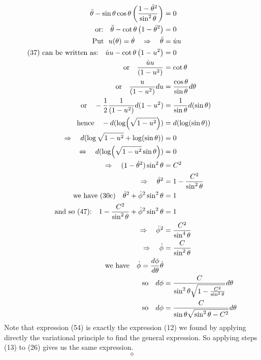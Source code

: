 \begin{align}
\ddot{\theta} - \sin\theta\cos\theta\left(\frac{1 - \dot{\theta}^2}{\sin^2\theta}\right)&= 0\\
\text{or:}\quad \ddot{\theta} - \cot\theta\left( 1-\dot{\theta}^2\right) &= 0\\
\text{Put }\ u(\theta)= \dot{\theta}\quad\Rightarrow\quad \ddot{\theta} &= \dot{u}u\\
\text{(37) can be written as:}\quad \dot{u}u - \cot\theta\left( 1-u^2\right) &= 0\\
\text{or}\quad \frac{\dot{u}u}{\left( 1-u^2\right)} &= \cot\theta\\
\text{or}\quad \frac{u}{\left( 1-u^2\right)}du &= \frac{\cos\theta}{\sin\theta} d\theta\\
\text{or}\quad -\frac{1}{2}\frac{1}{\left( 1-u^2\right)}d(1-u^2) &= \frac{1}{\sin \theta} d(\sin\theta)\\
\text{hence}\quad -d(\log (\sqrt{1-u^2})) &= d(\log(\sin\theta))\\
\Rightarrow \quad d(\log \sqrt{1-u^2} +\log(\sin\theta))&=0\\
\Leftrightarrow \quad d(\log( \sqrt{1-u^2}\sin\theta))&=0\\
\Rightarrow \quad (1-\dot{\theta}^2)\sin^2\theta &= C^2\\
\Rightarrow \quad \dot{\theta}^2&= 1-\frac{C^2}{\sin^2\theta}\\
\text{we have (30c)}\quad \dot{\theta}^2+\dot{\phi}^2\sin^2\theta &= 1\\
\text{and so (47):}\quad 1-\frac{C^2}{\sin^2\theta}+\dot{\phi}^2\sin^2\theta &= 1\\
\Rightarrow \quad \dot{\phi}^2 &= \frac{C^2}{\sin^4\theta}\\
\Rightarrow \quad \dot{\phi} &= \frac{C}{\sin^2\theta}\\
\text{we have} \quad \dot{\phi}=\dv{\phi}{\theta}\dot{\theta}\\
\text{so} \quad d\phi  &= \frac{C}{\sin^2\theta\sqrt{1-\frac{C^2}{\sin^2\theta}}}d\theta\\
\text{so} \quad d\phi  &= \frac{C}{\sin\theta\sqrt{\sin^2\theta-C^2}}d\theta
\end{align}
Note that expression (54) is exactly the expression (12) we found by applying directly the variational principle to find the general expression. So applying steps (13) to (26) gives us the same expression.
$$\diamond$$
\newpage
